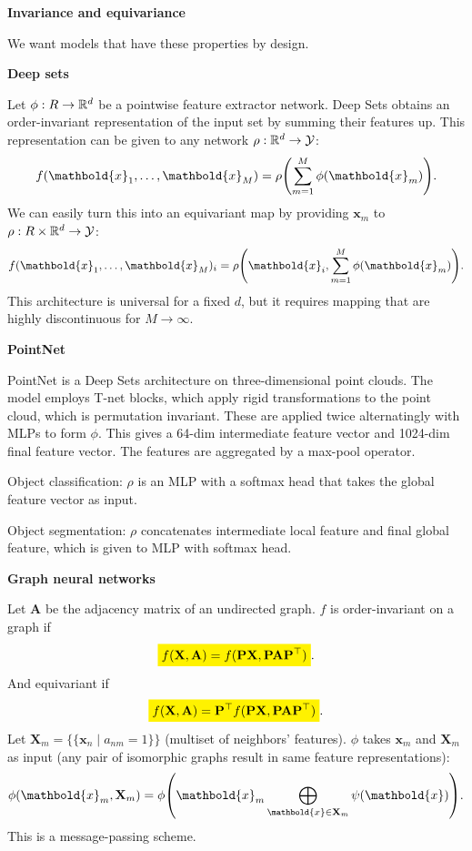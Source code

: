\documentclass[10pt]{article}
\newenvironment{topic}[1]
{\textbf{\sffamily \footnotesize \colorbox{black}{\rlap{\textbf{\textcolor{white}{#1}}}\hspace{\linewidth}\hspace{-2\fboxsep}}}}
{}
\newenvironment{subtopic}[1]
{\begin{center}\textbf{\footnotesize \sffamily #1}\end{center}}
{}
\renewcommand{\mat}[1]{\ensuremath{\mathbf{#1}}}
\renewcommand{\vec}[1]{\ensuremath{\mathbold{#1}}}
\begin{document}
\begin{multicols*}{3}
\begin{topic}{Geometric deep learning}
\begin{subtopic}{Invariance and equivariance}
            We want models that have these properties by design.
        \end{subtopic}

        \begin{subtopic}{Deep sets}
            Let $\phi: R \to \mathbb{R}^d$ be a pointwise feature extractor network. Deep Sets obtains an
            order-invariant representation of the input set by summing their features up. This
            representation can be given to any network $\rho: \mathbb{R}^d \to \mathcal{Y}$: \[
                f(\vec{x}_1, \ldots, \vec{x}_M) = \rho \lft( \sum_{m=1}^{M} \phi(\vec{x}_m) \rgt).
            \]
            We can easily turn this into an equivariant map by providing $\vec{x}_m$ to $\rho: R \times \mathbb{R}^d
                \to \mathcal{Y}$: \[
                f(\vec{x}_1, \ldots, \vec{x}_M)_i = \rho \lft( \vec{x}_i, \sum_{m=1}^{M} \phi(\vec{x}_m) \rgt).
            \]
            This architecture is universal for a fixed $d$, but it requires mapping that are highly
            discontinuous for $M \to \infty$.
        \end{subtopic}

        \begin{subtopic}{PointNet}
            PointNet is a Deep Sets architecture on three-dimensional point clouds. The model employs
            T-net blocks, which apply rigid transformations to the point cloud, which is permutation
            invariant. These are applied twice alternatingly with MLPs to form $\phi$. This gives a
            64-dim intermediate feature vector and 1024-dim final feature vector. The features are
            aggregated by a max-pool operator.

            Object classification: $\rho$ is an MLP with a softmax head that takes the global feature vector as
            input.

            Object segmentation: $\rho$ concatenates intermediate local feature and final global feature, which
            is given to MLP with softmax head.
        \end{subtopic}

        \begin{subtopic}{Graph neural networks}
            Let $\mat{A}$ be the adjacency matrix of an undirected graph. $f$ is order-invariant on a graph if \[
                \colorbox{yellow}{$\displaystyle f(\mat{X},\mat{A}) = f(\mat{P}\mat{X}, \mat{P}\mat{A}\transpose{\mat{P}})$}.
            \]
            And equivariant if \[
                \colorbox{yellow}{$\displaystyle f(\mat{X}, \mat{A}) = \transpose{\mat{P}} f(\mat{P}\mat{X},\mat{P}\mat{A}\transpose{\mat{P}})$}.
            \]
            Let $\mat{X}_m = \{ \{ \vec{x}_n \mid a_{nm} = 1 \} \}$ (multiset of neighbors' features). $\phi$
            takes $\vec{x}_m$ and $\mat{X}_m$ as input (any pair of isomorphic graphs result in same feature
            representations): \[
                \phi(\vec{x}_m, \mat{X}_m) = \phi \lft( \vec{x}_m \bigoplus_{\vec{x} \in \mat{X}_m} \psi(\vec{x}) \rgt).
            \]
            This is a message-passing scheme.


\end{subtopic}
\end{topic}
\end{multicols*}
\end{document}
